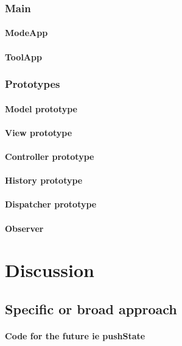 \documentclass[english]{ifimaster}
\begin{document}
\subsection{Main}
\subsubsection{ModeApp}
\subsubsection{ToolApp}

\subsection{Prototypes}
\subsubsection{Model prototype}
\subsubsection{View prototype}
\subsubsection{Controller prototype}
\subsubsection{History prototype}
\subsubsection{Dispatcher prototype}
\subsubsection{Observer}



\chapter{Discussion}
\section{Specific or broad approach}
\subsubsection{Code for the future ie pushState} {}
\end{document}
